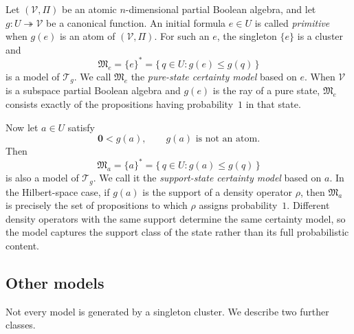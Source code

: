 \documentclass{article}   	%
\theoremstyle{plain}
\theoremstyle{definition}
\theoremstyle{remark}
\begin{document}
Let $(\mathcal V,\Pi)$ be an atomic $n$-dimensional partial Boolean algebra, and
let $g:U\twoheadrightarrow\mathcal V$ be a canonical function.
An initial formula $e\in U$ is called \emph{primitive} when $g(e)$ is an atom of
$(\mathcal V,\Pi)$.
For such an $e$, the singleton $\{e\}$ is a cluster and
\begin{equation}
\mathfrak M_e=\{e\}^*
=\{\,q\in U:g(e)\le g(q)\,\}
\label{pure}
\end{equation}
is a model of $\mathcal T_g$.
We call $\mathfrak M_e$ the \emph{pure-state certainty model} based on $e$.
When $\mathcal V$ is a subspace partial Boolean algebra and $g(e)$ is the ray of a
pure state, $\mathfrak M_e$ consists exactly of the propositions having
probability~$1$ in that state.

Now let $a\in U$ satisfy
\[
\mathbf 0<g(a),
\qquad
 g(a)\text{ is not an atom}.
\]
Then
\begin{equation}
\mathfrak M_a=\{a\}^*
=\{\,q\in U:g(a)\le g(q)\,\}
\label{mix}
\end{equation}
is also a model of $\mathcal T_g$.
We call it the \emph{support-state certainty model} based on $a$.
In the Hilbert-space case, if $g(a)$ is the support of a density operator $\rho$,
then $\mathfrak M_a$ is precisely the set of propositions to which $\rho$ assigns
probability~$1$.
Different density operators with the same support determine the same certainty
model, so the model captures the support class of the state rather than its full
probabilistic content.

\subsection{Other models}

Not every model is generated by a singleton cluster.
We describe two further classes.
\end{document}
